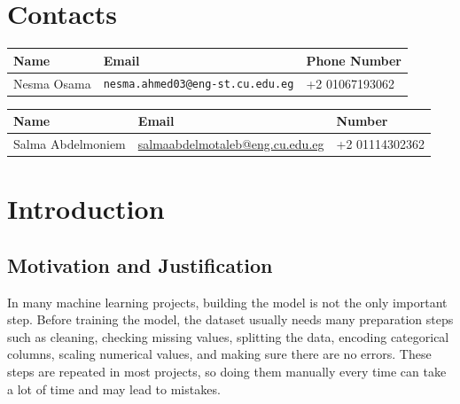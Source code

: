 \documentclass[12pt,a4paper,oneside]{report}
\begin{document}
\clearpage
\chapter*{Contacts}


\begin{table}[h!]
\centering
\small
\renewcommand{\arraystretch}{1.15}
\setlength{\tabcolsep}{4pt}

\begin{tabularx}{\textwidth}{|p{}|>{\raggedright\arraybackslash}X|p{}|}
\hline
\textbf{Name} & \textbf{Email} & \textbf{Phone Number} \\ \hline
Nesma Osama & \texttt{nesma.ahmed03@eng-st.cu.edu.eg} & +2 01067193062 \\ \hline
\end{tabularx}

\end{table}

\begin{table}[h!]
\centering
\begin{tabular}{|p{}|p{}|p{}|}
\hline
\textbf{Name} & \textbf{Email} & \textbf{Number} \\ \hline
Salma Abdelmoniem & \underline{salmaabdelmotaleb@eng.cu.edu.eg}  & +2 01114302362 \\ \hline
\end{tabular}
\end{table}


\clearpage

\chapter{Introduction}
\label{chap:introduction}

\section{Motivation and Justification}
In many machine learning projects, building the model is not the only important step. Before training the model, the dataset usually needs many preparation steps such as cleaning, checking missing values, splitting the data, encoding categorical columns, scaling numerical values, and making sure there are no errors. These steps are repeated in most projects, so doing them manually every time can take a lot of time and may lead to mistakes.\\
\end{document}
